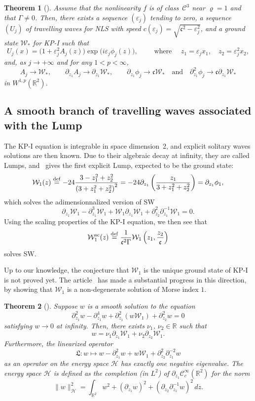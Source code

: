 \documentclass[10pt]{amsart}
\newtheorem{theo}{Theorem}[section]
\theoremstyle{definition}\newtheorem{defi}[theo]{Definition}\newtheorem{rema}[theo]{Remark}\newtheorem{exam}[theo]{Example}\newtheorem{exem}[theo]{Example}\newtheorem{nota}[theo]{Notation}
\newcommand*\p{\partial}
\newcommand*\R{\mathbb R}
\newcommand*\ddef{\stackrel{\rm def}{=}}
\renewcommand{\sc}{\mathrm{sc}}
\newcommand*\BC{\mathcal{C}}
\newcommand*\BH{\mathcal{H}}
\newcommand*\BW{\mathcal{W}}
\newcommand*\cs{{\mathfrak c}}
\newcommand{\fkL}{\mathfrak{L}}
\newcommand*\ii{\infty}
\newcommand*\e{\varepsilon}
\newcommand*\G{\Gamma}
\begin{document}
\begin{theo}[\cite{BGStranso2d,CMraref}]\label{res1}
Assume that the nonlinearity $f$ is of class~$ \BC^3 $ near $ \varrho = 1 $ and that $ \G \neq 0$. Then, there exists a sequence $ (\e_j) $ tending to zero, a sequence $ (U_j) $ of travelling waves for NLS with speed $ c (\e_j) = \sqrt{ \cs ^2 - \e_j^2} $, and a ground state $ \BW_* $ for KP-I such that
\[
U_j (x) = \big(1 + \e_j^2 A_j (z) \big)
\exp \big(i \e_j \phi_j (z) \big), \qquad  \text{ where } \quad z_1 = \e_j x_1, \quad z_2 = \e_j^2 x_2,
\]
and, as $ j \to + \ii $ and for any $1 < p < \ii $,
\[
A_j \to \BW_*, \qquad
\p_{z_1} A_j \to \p_{z_1} \BW_*, \qquad
\p_{z_1} \phi_j \to \cs \BW_* \quad \text{and} \quad
\p_{z_1} ^2 \phi_j \to \cs \p_{z_1} \BW_*
\]
in $ W^{1,p}(\R^2) $.
\end{theo}



\subsection{A smooth branch of travelling waves associated with the Lump}

The KP-I equation is integrable in space dimension~2, and explicit solitary waves solutions are then known. Due to their algebraic decay at infinity, they are called Lumps, and~\cite{MZBM} gives the first explicit Lump, expected to be the ground state:
\[
\BW_1 (z) \ddef - 24 \frac{3 - z_1^2 + z_2^2}{\left(3 + z_1^2 + z_2^2\right)^2} = - 24 \p_{z_1} \left(\frac{z_1}{3 + z_1^2 + z_2^2 } \right) = \p_{z_1} \phi_1,
\]
which solves the adimensionnalized version of SW
\[
\p_{z_1} \BW_1 - \p^3_{z_1} \BW_1 + \BW_1 \p_{z_1} \BW_1 + \p_{z_2}^2 \p_{z_1}^{-1} \BW_1 = 0.
\]
Using the scaling properties of the KP-I equation, we then see that
\begin{equation}\label{Wsc_NLS}
\BW_1^{\sc} (z) \ddef \frac{1}{\cs^2 \G} \BW_1 \left(z_1, \frac{z_2}{\cs} \right)
\end{equation} solves SW.

Up to our knowledge, the conjecture that $ \BW_1 $ is the unique ground state of KP-I is not proved yet. The article~\cite{Liu_Wei_Lump} has made a substantial progress in this direction, by showing that $ \BW_1 $ is a non-degenerate solution of Morse index $1$.



\begin{theo}[\cite{Liu_Wei_Lump}]\label{Lump_nondege}
Suppose $w$ is a smooth solution to the equation
\[
\p_{z_1}^2 w - \p^4_{z_1} w + \p_{z_1}^2 (w \BW_1) + \p_{z_2}^2 w = 0
\]
satisfying $ w \to 0 $ at infinity. Then, there exists $ \nu_1 $, $ \nu_2 \in \R $ such that
\[
w = \nu_1 \p_{z_1} \BW_1 + \nu_2 \p_{z_2} \BW_1.
\]
Furthermore, the linearized operator
\[
\fkL : w \mapsto w - \p^2_{z_1} w + w \BW_1 + \p_{z_2}^2 \p_{z_1}^{-2} w
\]
as an operator on the energy space $ \BH $ has exactly one negative eigenvalue. The energy space $ \BH $ is defined as the completion (in $ L^2 $) of $ \p_{z_1} \BC_c^\ii(\R^2) $ for the norm
\[
\| w \|_{\BH}^2 = \int_{\R^2} w^2 + (\p_{z_1} w)^2 + \left(\p_{z_2} \p_{z_1}^{-1} w\right)^2 \, dz.
\]
\end{theo}
\end{document}
